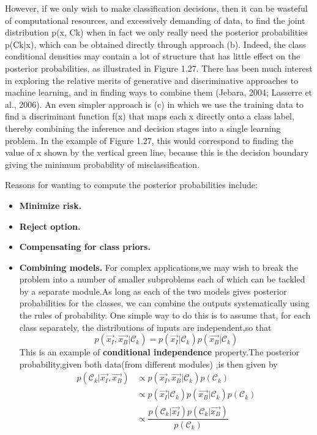 However, if we only wish to make classification decisions, then it can be wasteful
of computational resources, and excessively demanding of data, to find the joint
distribution p(x, Ck) when in fact we only really need the posterior probabilities
p(Ck|x), which can be obtained directly through approach (b). Indeed, the class conditional
densities may contain a lot of structure that has little effect on the posterior
probabilities, as illustrated in Figure 1.27. There has been much interest in
exploring the relative merits of generative and discriminative approaches to machine
learning, and in finding ways to combine them (Jebara, 2004; Lasserre et al., 2006).
An even simpler approach is (c) in which we use the training data to find a
discriminant function f(x) that maps each x directly onto a class label, thereby
combining the inference and decision stages into a single learning problem. In the
example of Figure 1.27, this would correspond to finding the value of x shown by
the vertical green line, because this is the decision boundary giving the minimum
probability of misclassification.

Reasons for wanting to compute the posterior probabilities include:
\begin{itemize}
	\item \textbf{Minimize risk.}
	\item \textbf{Reject option.}
	\item \textbf{Compensating for class priors.}
	\item \textbf{Combining models.} For complex applications,we may wish to break the problem into a number of smaller subproblems each of which can be tackled by a separate module.As long as each of 	the two models gives posterior probabilities for the classes, we can combine 	the outputs systematically using the rules of probability. One simple way to 	do this is to assume that, for each class separately, the distributions of inputs are independent,so that
	\begin{equation}
	p(\vec{x_I},\vec{x_B}|\mathcal{C}_k)  = p(\vec{x_I}|\mathcal{C}_k)p(\vec{x_B}|\mathcal{C}_k)
	\end{equation}
	This is an example of \textbf{conditional independence} property.The posterior probability,given both data(from different modules) ,is then given by 
	\begin{align}
	p(\mathcal{C}_k|\vec{x_I},\vec{x_B}) &\propto p(\vec{x_I},\vec{x_B}|\mathcal{C}_k)p(\mathcal{C}_k) \\
	&\propto p(\vec{x_I}|\mathcal{C}_k)p(\vec{x_B}|\mathcal{C}_k)p(\mathcal{C}_k) \\
	&\propto \dfrac{p(\mathcal{C}_k|\vec{x_I})p(\mathcal{C}_k|\vec{x_B})}{p(\mathcal{C}_k)}
	\end{align}
\end{itemize}

